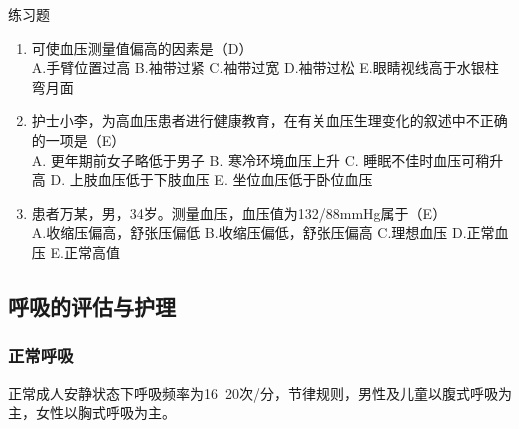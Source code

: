 \documentclass[11pt, a4paper]{ctexart}
\begin{document}
\begin{examplebox}{练习题}
\begin{enumerate}
    \item 可使血压测量值偏高的因素是（D）\\
    A.手臂位置过高 \quad B.袖带过紧 \quad C.袖带过宽 \quad D.袖带过松 \quad E.眼睛视线高于水银柱弯月面
    \item 护士小李，为高血压患者进行健康教育，在有关血压生理变化的叙述中不正确的一项是（E）\\
    A. 更年期前女子略低于男子 \quad B. 寒冷环境血压上升 \quad C. 睡眠不佳时血压可稍升高 \quad D. 上肢血压低于下肢血压 \quad E. 坐位血压低于卧位血压
    \item 患者万某，男，34岁。测量血压，血压值为132/88mmHg属于（E）\\
    A.收缩压偏高，舒张压偏低 \quad B.收缩压偏低，舒张压偏高 \quad C.理想血压 \quad D.正常血压 \quad E.正常高值
\end{enumerate}
\end{examplebox}

\subsection{呼吸的评估与护理}
\subsubsection{正常呼吸}
正常成人安静状态下呼吸频率为16~20次/分，节律规则，男性及儿童以腹式呼吸为主，女性以胸式呼吸为主。
\end{document}

